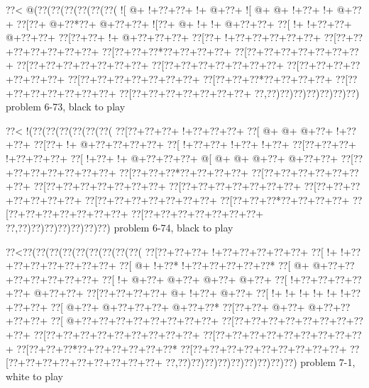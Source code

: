 \vbox{\vbox{\goo
\0??<\- @(\0??(\0??(\0??(\0??(\0??(\0??(
\- ![\- @+\- !+\0??+\0??+\- !+\- @+\0??+
\- ![\- @+\- @+\- !+\0??+\- !+\- @+\0??+
\0??[\0??+\- @+\0??*\0??+\- @+\0??+\0??+
\- ![\0??+\- @+\- !+\- !+\- @+\0??+\0??+
\0??[\- !+\- !+\0??+\0??+\- @+\0??+\0??+
\0??[\0??+\0??+\- !+\- @+\0??+\0??+\0??+
\0??[\0??+\- !+\0??+\0??+\0??+\0??+\0??+
\0??[\0??+\0??+\0??+\0??+\0??+\0??+\0??+
\0??[\0??+\0??+\0??*\0??+\0??+\0??+\0??+
\0??[\0??+\0??+\0??+\0??+\0??+\0??+\0??+
\0??[\0??+\0??+\0??+\0??+\0??+\0??+\0??+
\0??[\0??+\0??+\0??+\0??+\0??+\0??+\0??+
\0??[\0??+\0??+\0??+\0??+\0??+\0??+\0??+
\0??[\0??+\0??+\0??+\0??+\0??+\0??+\0??+
\0??[\0??+\0??+\0??*\0??+\0??+\0??+\0??+
\0??[\0??+\0??+\0??+\0??+\0??+\0??+\0??+
\0??[\0??+\0??+\0??+\0??+\0??+\0??+\0??+
\0??,\0??)\0??)\0??)\0??)\0??)\0??)\0??)
}
\hfil problem 6-73, black to play\hfil\break
}

\vbox{\vbox{\goo
\0??<\- !(\0??(\0??(\0??(\0??(\0??(\0??(
\0??[\0??+\0??+\0??+\- !+\0??+\0??+\0??+
\0??[\- @+\- @+\- @+\0??+\- !+\0??+\0??+
\0??[\0??+\- !+\- @+\0??+\0??+\0??+\0??+
\0??[\- !+\0??+\0??+\- !+\0??+\- !+\0??+
\0??[\0??+\0??+\0??+\- !+\0??+\0??+\0??+
\0??[\- !+\0??+\- !+\- @+\0??+\0??+\0??+
\- @[\- @+\- @+\- @+\0??+\- @+\0??+\0??+
\0??[\0??+\0??+\0??+\0??+\0??+\0??+\0??+
\0??[\0??+\0??+\0??*\0??+\0??+\0??+\0??+
\0??[\0??+\0??+\0??+\0??+\0??+\0??+\0??+
\0??[\0??+\0??+\0??+\0??+\0??+\0??+\0??+
\0??[\0??+\0??+\0??+\0??+\0??+\0??+\0??+
\0??[\0??+\0??+\0??+\0??+\0??+\0??+\0??+
\0??[\0??+\0??+\0??+\0??+\0??+\0??+\0??+
\0??[\0??+\0??+\0??*\0??+\0??+\0??+\0??+
\0??[\0??+\0??+\0??+\0??+\0??+\0??+\0??+
\0??[\0??+\0??+\0??+\0??+\0??+\0??+\0??+
\0??,\0??)\0??)\0??)\0??)\0??)\0??)\0??)
}
\hfil problem 6-74, black to play\hfil\break
}

\vbox{\vbox{\goo
\0??<\0??(\0??(\0??(\0??(\0??(\0??(\0??(\0??(\0??(
\0??[\0??+\0??+\0??+\- !+\0??+\0??+\0??+\0??+\0??+
\0??[\- !+\- !+\0??+\0??+\0??+\0??+\0??+\0??+\0??+
\0??[\- @+\- !+\0??*\- !+\0??+\0??+\0??+\0??+\0??*
\0??[\- @+\- @+\0??+\0??+\0??+\0??+\0??+\0??+\0??+
\0??[\- !+\- @+\0??+\- @+\0??+\- @+\0??+\- @+\0??+
\0??[\- !+\0??+\0??+\0??+\0??+\0??+\- @+\0??+\0??+
\0??[\0??+\0??+\0??+\0??+\- @+\- !+\0??+\- @+\0??+
\0??[\- !+\- !+\- !+\- !+\- !+\- !+\0??+\0??+\0??+
\0??[\- @+\0??+\- @+\0??+\0??+\0??+\- @+\0??+\0??*
\0??[\0??+\0??+\- @+\0??+\- @+\0??+\0??+\0??+\0??+
\0??[\- @+\0??+\0??+\0??+\0??+\0??+\0??+\0??+\0??+
\0??[\0??+\0??+\0??+\0??+\0??+\0??+\0??+\0??+\0??+
\0??[\0??+\0??+\0??+\0??+\0??+\0??+\0??+\0??+\0??+
\0??[\0??+\0??+\0??+\0??+\0??+\0??+\0??+\0??+\0??+
\0??[\0??+\0??+\0??*\0??+\0??+\0??+\0??+\0??+\0??*
\0??[\0??+\0??+\0??+\0??+\0??+\0??+\0??+\0??+\0??+
\0??[\0??+\0??+\0??+\0??+\0??+\0??+\0??+\0??+\0??+
\0??,\0??)\0??)\0??)\0??)\0??)\0??)\0??)\0??)\0??)
}
\hfil problem 7-1, white to play\hfil\break
}

